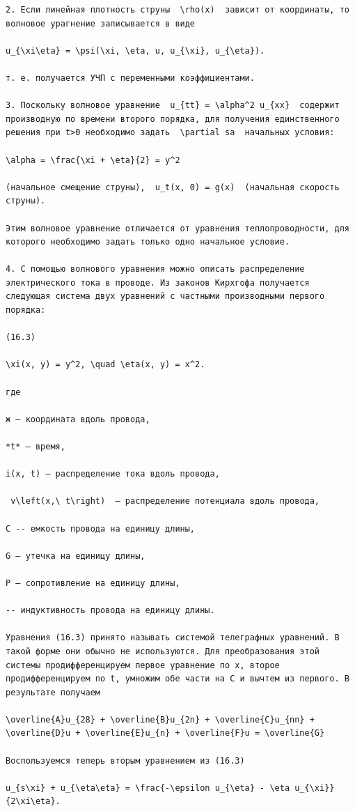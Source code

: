 \documentclass[
  ukrainian,
]{article}
\begin{document}
\begin{verbatim}
2. Если линейная плотность струны  \rho(x)  зависит от координаты, то волновое урагнение записывается в виде

u_{\xi\eta} = \psi(\xi, \eta, u, u_{\xi}, u_{\eta}).

т. е. получается УЧП с переменными коэффициентами.

3. Поскольку волновое уравнение  u_{tt} = \alpha^2 u_{xx}  содержит производную по времени второго порядка, для получения единственного решения при t>0 необходимо задать  \partial sa  начальных условия:

\alpha = \frac{\xi + \eta}{2} = y^2

(начальное смещение струны),  u_t(x, 0) = g(x)  (начальная скорость струны).

Этим волновое уравнение отличается от уравнения теплопроводности, для которого необходимо задать только одно начальное условие.

4. С помощью волнового уравнения можно описать распределение электрического тока в проводе. Из законов Кирхгофа получается следующая система двух уравнений с частными производными первого порядка:

(16.3)

\xi(x, y) = y^2, \quad \eta(x, y) = x^2.

где

ж — координата вдоль провода,

*t* — время,

i(x, t) — распределение тока вдоль провода,

 v\left(x,\ t\right)  — распределение потенциала вдоль провода,

С -- емкость провода на единицу длины,

G — утечка на единицу длины,

Р — сопротивление на единицу длины,

-- индуктивность провода на единицу длины.

Уравнения (16.3) принято называть системой телеграфных уравнений. В такой форме они обычно не используются. Для преобразования этой системы продифференцируем первое уравнение по x, второе продифференцируем по t, умножим обе части на C и вычтем из первого. В результате получаем

\overline{A}u_{28} + \overline{B}u_{2n} + \overline{C}u_{nn} + \overline{D}u + \overline{E}u_{n} + \overline{F}u = \overline{G}

Воспользуемся теперь вторым уравнением из (16.3)

u_{s\xi} + u_{\eta\eta} = \frac{-\epsilon u_{\eta} - \eta u_{\xi}}{2\xi\eta}.


\end{verbatim}
\end{document}
